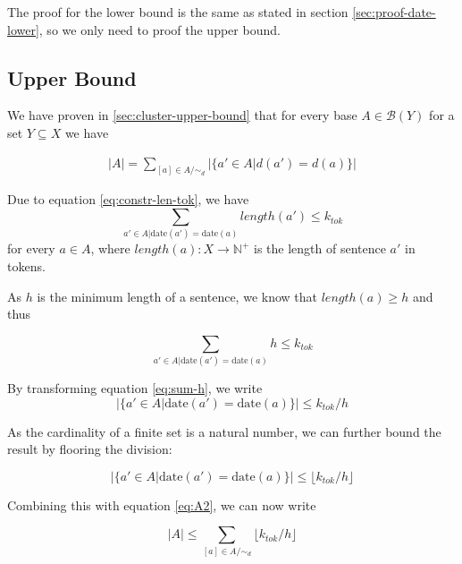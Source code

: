\documentclass[a4paper,BCOR=10mm]{report}
\numberwithin{lemma}{chapter}
\numberwithin{definition}{chapter}
\begin{document}
\begin{appendices}
The proof for the lower bound is the same as stated in section \ref{sec:proof-date-lower}, so we only need to proof the upper bound.

\subsection{Upper Bound}

We have proven in \ref{sec:cluster-upper-bound} that for every base $A \in \mathcal{B}(Y)$ for a set $Y \subseteq X$ we have

\begin{align}
|A| = \sum_{[a] \in A/\sim_d} |\{ a' \in A | d(a') = d(a) \}|
\end{align}

Due to equation \ref{eq:constr-len-tok}, we have
\begin{equation}
\sum_{ a' \in A | \text{date}(a') = \text{date}(a)} \mathit{length}(a') \leq k_{tok}
\end{equation}
for every $a \in A$, where $\mathit{length}(a) : X \rightarrow \mathbb{N}^+$ is the length of sentence $a'$ in tokens.

As $h$ is the minimum length of a sentence, we know that $\mathit{length}(a) \geq h$ and thus

\begin{equation}
\sum_{ a' \in A | \text{date}(a') = \text{date}(a)} h \leq k_{tok} \label{eq:sum-h}
\end{equation}

By transforming equation \ref{eq:sum-h}, we write
\begin{equation}
|\{ a' \in A | \text{date}(a') = \text{date}(a)\}| \leq k_{tok}/h
\end{equation}

As the cardinality of a finite set is a natural number, we can further bound the result by flooring the division:

\begin{equation}
|\{ a' \in A | \text{date}(a') = \text{date}(a)\}| \leq \lfloor k_{tok}/h \rfloor
\end{equation}


Combining this with equation \ref{eq:A2}, we can now write

\begin{equation}
|A| \leq \sum_{[a] \in A/\sim_d} \lfloor k_{tok}/h \rfloor
\end{equation}


\end{appendices}
\end{document}
